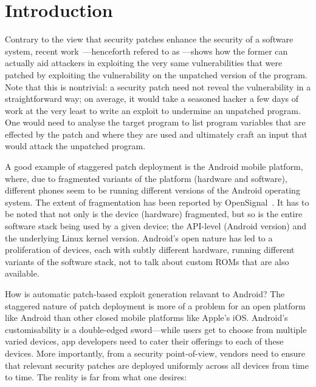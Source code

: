 \section{Introduction} \label{sec:intro}

Contrary to the view that security patches enhance the security of a software system, recent work~\cite{apeg08}---henceforth refered to as \ap---shows how the former can actually aid attackers in exploiting the very same vulnerabilities that were patched by exploiting the vulnerability on the unpatched version of the program. Note that this is nontrivial: a security patch need not reveal the vulnerability in a straightforward way; on average, it would take a seasoned hacker a few days of work at the very least to write an exploit to undermine an unpatched program. One would need to analyse the target program to list program variables that are effected by the patch and where they are used and ultimately craft an input that would attack the unpatched program.

A good example of staggered patch deployment is the Android mobile platform, where, due to fragmented variants of the platform (hardware and software), different phones seem to be running different versions of the Android operating system. The extent of fragmentation has been reported by OpenSignal~\cite{opensignal}. It has to be noted that not only is the device (hardware) fragmented, but so is the entire software stack being used by a given device; the API-level (Android version) and the underlying Linux kernel version. Android's open nature has led to a proliferation of devices, each with subtly different hardware, running different variants of the software stack, not to talk about custom ROMs that are also available.

How is automatic patch-based exploit generation relavant to Android? The staggered nature of patch deployment is more of a problem for an open platform like Android than other closed mobile platforms like Apple's iOS. Android's customisability is a double-edged sword---while users get to choose from multiple varied devices, app developers need to cater their offerings to each of these devices. More importantly, from a security point-of-view, vendors need to ensure that relevant security patches are deployed uniformly across all devices from time to time. The reality is far from what one desires: 